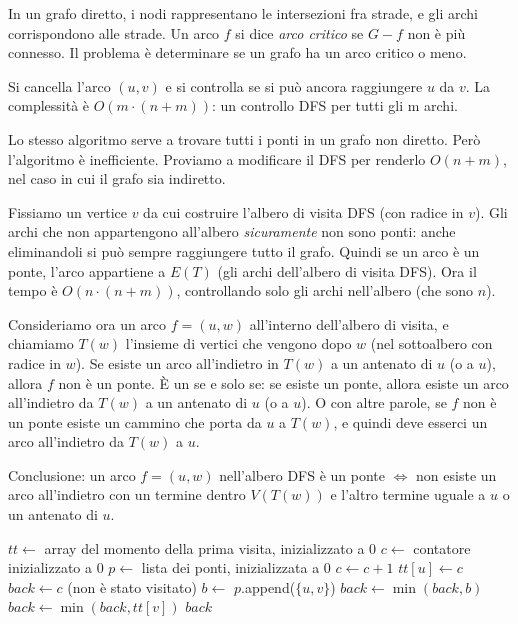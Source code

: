 \begin{esercizio}
In un grafo diretto, i nodi rappresentano le intersezioni fra strade, e gli archi corrispondono alle strade. Un arco $f$ si dice \emph{arco critico} se $G - f$ non \`e pi\`u connesso. Il problema \`e determinare se un grafo ha un arco critico o meno.
\end{esercizio}

Si cancella l'arco $(u,v)$ e si controlla se si pu\`o ancora raggiungere $u$ da $v$. La complessit\`a \`e $O(m \cdot (n + m))$: un controllo DFS per tutti gli m archi.

Lo stesso algoritmo serve a trovare tutti i ponti in un grafo non diretto. Per\`o l'algoritmo \`e inefficiente. Proviamo a modificare il DFS per renderlo $O(n + m)$, nel caso in cui il grafo sia indiretto.

Fissiamo un vertice $v$ da cui costruire l'albero di visita DFS (con radice in $v$). Gli archi che non appartengono all'albero \emph{sicuramente} non sono ponti: anche eliminandoli si pu\`o sempre raggiungere tutto il grafo. Quindi se un arco \`e un ponte, l'arco appartiene a $E(T)$ (gli archi dell'albero di visita DFS). Ora il tempo \`e $O(n \cdot (n + m))$, controllando solo gli archi nell'albero (che sono $n$).

Consideriamo ora un arco $f = (u,w)$ all'interno dell'albero di visita, e chiamiamo $T(w)$ l'insieme di vertici che vengono dopo $w$ (nel sottoalbero con radice in $w$). Se esiste un arco all'indietro in $T(w)$ a un antenato di $u$ (o a $u$), allora $f$ non \`e un ponte. \`E un se e solo se: se esiste un ponte, allora esiste un arco all'indietro da $T(w)$ a un antenato di $u$ (o a $u$). O con altre parole, se $f$ non \`e un ponte esiste un cammino che porta da $u$ a $T(w)$, e quindi deve esserci un arco all'indietro da $T(w)$ a $u$.

Conclusione: un arco $f = (u,w)$ nell'albero DFS \`e un ponte $\iff$ non esiste un arco all'indietro con un termine dentro $V(T(w))$ e l'altro termine uguale a $u$ o un antenato di $u$.

\begin{algorithm}
\caption{Visita DFS per trovare un ponte}
\begin{algorithmic}[1]
\State $tt \gets$ array del momento della prima visita, inizializzato a 0
\State $c \gets$ contatore inizializzato a 0
\State $p \gets$ lista dei ponti, inizializzata a 0
    \State $c \gets c + 1$
    \State $tt[u] \gets c$
    \State $back \gets c $
         (non \`e stato visitato)
            \State $b \gets$ 
                \State $p$.append($\{u,v\}$)
            \EndIf
            \State $back \gets \min(back, b)$
            \State $back \gets \min(back, tt[v])$
        \EndIf
    \EndFor
    \State \Return $back$
\EndFunction
\end{algorithmic}
\end{algorithm}

